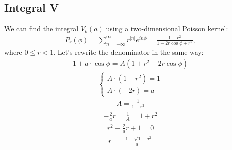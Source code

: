 \subsection{Integral V}
We can find the integral $V_k(a)$ using a two-dimensional Poisson kernel:
\begin{equation}\begin{aligned}
P_r(\phi) = \sum_{n = -\infty}^{\infty} r^{|n|} e^{in\phi} = \frac{1 - r^2}{1 - 2r\cos \phi + r^2},
\end{aligned}\end{equation}
where $0 \le r < 1$. Let's rewrite the denominator in the same way:
\begin{equation}\begin{aligned}
1 + a \cdot\cos \phi = A (1 + r^2 - 2r\cos\phi)
\end{aligned}\end{equation}
\begin{equation*}\begin{aligned}
\begin{cases}
    A \cdot (1 + r^2) = 1 \\
    A \cdot (-2r) = a
\end{cases}
\end{aligned}\end{equation*}
\begin{equation}\begin{aligned}
    A = \frac{1}{1 + r^2} 
\end{aligned}\end{equation}
\begin{equation*}\begin{aligned}
-\frac{2}{a}r = \frac{1}{A} = 1 + r^2
\end{aligned}\end{equation*}
\begin{equation*}\begin{aligned}
 r^2 + \frac{2}{a}r + 1 = 0
\end{aligned}\end{equation*}
\begin{equation}\begin{aligned}
 r = \frac{-1 + \sqrt{1 - a^2}}{a}
\end{aligned}\end{equation}

